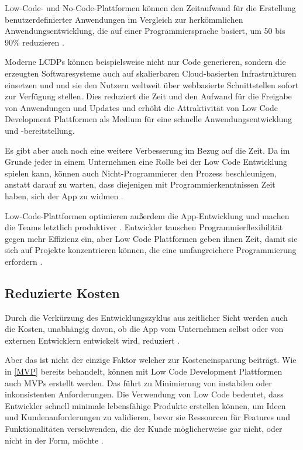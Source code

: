 \documentclass[12pt]{article} %
\begin{document}
	Low-Code- und No-Code-Plattformen können den Zeitaufwand für die Erstellung benutzerdefinierter Anwendungen im Vergleich zur herkömmlichen Anwendungsentwicklung, die auf einer Programmiersprache basiert, um 50 bis 90\% reduzieren \autocite{KevinShuler.2023}. \newline
		
	Moderne LCDPs können beispielsweise nicht nur Code generieren, sondern die erzeugten Softwaresysteme auch auf skalierbaren Cloud-basierten Infrastrukturen einsetzen und und sie den Nutzern weltweit über webbasierte Schnittstellen sofort zur Verfügung stellen. Dies reduziert die Zeit und den Aufwand für die Freigabe von Anwendungen und Updates und erhöht die Attraktivität von Low Code Development Plattformen als Medium für eine schnelle Anwendungsentwicklung und -bereitstellung. \autocite{DiRuscio.2022}
	
	Es gibt aber auch noch eine weitere Verbesserung im Bezug auf die Zeit. Da im Grunde jeder in einem Unternehmen eine Rolle bei der Low Code Entwicklung spielen kann, können auch Nicht-Programmierer den Prozess beschleunigen, anstatt darauf zu warten, dass diejenigen mit Programmierkenntnissen Zeit haben, sich der App zu widmen \autocite{Microsoft.2023}.
	
	Low-Code-Plattformen optimieren außerdem die App-Entwicklung und machen die Teams letztlich produktiver \autocite{Microsoft.2023}. Entwickler tauschen Programmierflexibilität gegen mehr Effizienz ein, aber Low Code Plattformen geben ihnen Zeit, damit sie sich auf Projekte konzentrieren können, die eine umfangreichere Programmierung erfordern \autocite{Microsoft.2023}.
	
	\subsection{Reduzierte Kosten}	
	Durch die Verkürzung des Entwicklungszyklus aus zeitlicher Sicht werden auch die Kosten, unabhängig davon, ob die App vom Unternehmen selbst oder von externen Entwicklern entwickelt wird, reduziert \autocite{Sanchis.2020b}. \newline
	
	Aber das ist nicht der einzige Faktor welcher zur Kosteneinsparung beiträgt. Wie in \ref{MVP} bereits behandelt, können mit Low Code Development Plattformen auch MVPs erstellt werden. Das führt zu Minimierung von instabilen oder inkonsistenten Anforderungen. Die Verwendung von Low Code bedeutet, dass Entwickler schnell minimale lebensfähige Produkte erstellen können, um Ideen und Kundenanforderungen zu validieren, bevor sie Ressourcen für Features und Funktionalitäten verschwenden, die der Kunde möglicherweise gar nicht, oder nicht in der Form, möchte \autocite{Sanchis.2020b}. \newline
	
\end{document}
